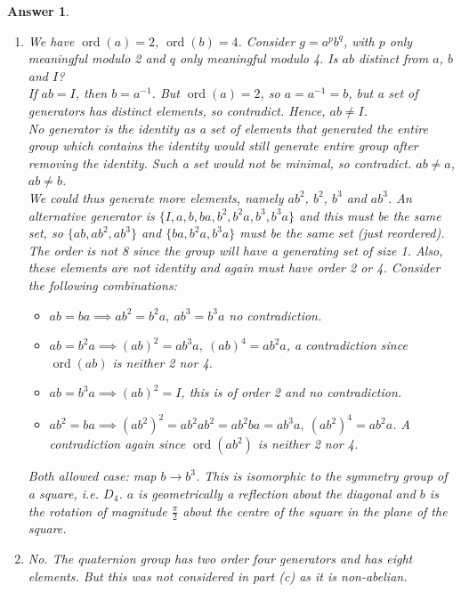 \documentclass[a4paper]{article}
\DeclareMathOperator{\ord}{ord}
\newtheorem{ans}{Answer}[section]
\theoremstyle{new}
\begin{document}
\begin{ans}
\begin{enumerate}[label=(\alph*)]
where $A^2=B^2=C^2=I$, $A$, $B$ and $C$ act as generators for this group. We have $AB=BA=(e_1,a_2,a_3)$, $AC=CA=(a_1,e_2,a_3)$, $BC=CB=(a_1,a_2,e_3)$, $ABC=(a_1,a_2,a_3)$, which are all (8 of them) in $C_2\times C_2\times C_2$. Also, we have established that this is an abelian group.
\item We have $\ord(a)=2$, $\ord(b)=4$. Consider $g=a^pb^q$, with $p$ only meaningful modulo 2 and $q$ only meaningful modulo 4. Is $ab$ distinct from $a$, $b$ and $I$?\\[5pt]
If $ab=I$, then $b=a^{-1}$. But $\ord(a)=2$, so $a=a^{-1}=b$, but a set of generators has distinct elements, so contradict. Hence, $ab\neq I$.\\[5pt]
No generator is the identity as a set of elements that generated the entire group which contains the identity would still generate entire group after removing the identity. Such a set would not be minimal, so contradict. $ab\neq a$, $ab\neq b$.\\[5pt]
We could thus generate more elements, namely $ab^2$, $b^2$, $b^3$ and $ab^3$. An alternative generator is $\{I,a,b,ba,b^2,b^2a,b^3,b^3a\}$ and this must be the same set, so $\{ab,ab^2,ab^3\}$ and $\{ba,b^2a,b^3a\}$ must be the same set (just reordered). The order is not 8 since the group will have a generating set of size 1. Also, these elements are not identity and again must have order 2 or 4. Consider the following combinations:
\begin{itemize}
    \item $ab=ba\implies ab^2=b^2a,~ab^3=b^3a$ no contradiction.
    \item $ab=b^2a\implies(ab)^2=ab^3a,~(ab)^4=ab^2a$, a contradiction since $\ord(ab)$ is neither 2 nor 4.
    \item $ab=b^3a\implies (ab)^2=I$, this is of order 2 and no contradiction.
    \item $ab^2=ba\implies(ab^2)^2=ab^2ab^2=ab^2ba=ab^3a,~(ab^2)^4=ab^2a$. A contradiction again since $\ord(ab^2)$ is neither 2 nor 4.
\end{itemize}
Both allowed case: map $b\rightarrow b^3$. This is isomorphic to the symmetry group of a square, i.e. $D_4$. $a$ is geometrically a reflection about the diagonal and $b$ is the rotation of magnitude $\frac{\pi}{2}$ about the centre of the square in the plane of the square.
\item No. The quaternion group has two order four generators and has eight elements. But this was not considered in part (c) as it is non-abelian.
\end{enumerate}
\end{ans}
\end{document}
